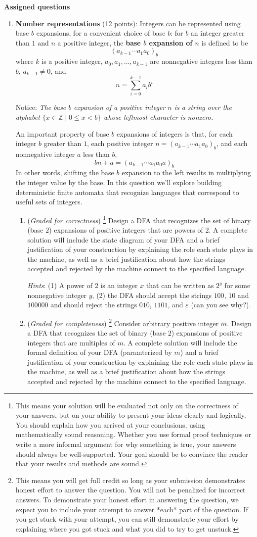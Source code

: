 \documentclass[12pt, oneside]{article}
\newcommand{\gradeCorrect}{({\it Graded for correctness}) }
\newcommand{\gradeCorrectFirst}{\gradeCorrect\footnote{This means your solution 
will be evaluated not only on the correctness of your answers, but on your ability
to present your ideas clearly and logically. You should explain how you 
arrived at your conclusions, using
mathematically sound reasoning. Whether you use formal proof techniques or 
write a more informal argument
for why something is true, your answers should always be well-supported. 
Your goal should be to convince the
reader that your results and methods are sound.} }
\newcommand{\gradeComplete}{({\it Graded for completeness}) }
\newcommand{\gradeCompleteFirst}{\gradeComplete\footnote{This means you will 
get full credit so long as your submission demonstrates honest effort to 
answer the question. You will not be penalized for incorrect answers. 
To demonstrate your honest effort in answering the question, we 
expect you to include your attempt to answer *each* part of the question. 
If you get stuck with your attempt, you can still demonstrate 
your effort by explaining where you got stuck and what 
you did to try to get unstuck.} }
\newcommand{\st}{\mid}
\begin{document}
{\bf Assigned questions}
\begin{enumerate}[wide, labelwidth=!, labelindent=0pt]
\item \textbf{Number representations} (12 points):
Integers can be represented using base $b$ expansions, for a convenient choice of base $b$: 
for $b$ an integer greater than $1$ and $n$ a positive integer, 
the {\bf base $b$ expansion of $n$}  is defined to be
\[
(a_{k-1} \cdots a_1 a_0)_b
\]
where $k$ is a positive integer, $a_0, a_1, \ldots, a_{k-1}$ 
are nonnegative integers less than $b$, $a_{k-1} \neq  0$, and
\[
n =  \sum_{i=0}^{k-1} a_{i} b^{i}
\]

Notice: {\it The base $b$ expansion of a positive integer $n$ is a string over the alphabet 
$\{x \in \mathbb{Z} \st 0 \leq x < b\}$
whose leftmost character is nonzero.}

An important property of base $b$ expansions of integers is that, for each integer $b$ greater than $1$,
each positive integer $n = (a_{k-1} \cdots a_1 a_0)_b$, and each nonnegative integer $a$ less than $b$, 
\[
    bn + a = (a_{k-1} \cdots a_1 a_0a)_b
\]
In other words, shifting the base $b$ expansion to the left results in multiplying the integer value by the base.
In this question we'll explore building deterministic finite automata that recognize 
languages that correspond to useful sets of integers.

    \begin{enumerate}
    \item\gradeCorrectFirst Design a DFA that recognizes the set of binary (base $2$) expansions of 
    positive integers that are powers of $2$. A complete solution will include the state diagram of your DFA and 
    a brief justification 
    of your construction by explaining the role each state plays in the machine, as well as a brief 
    justification about how the strings accepted and rejected by the machine connect to the specified language.

    {\it Hints}: (1) A power of $2$ is an integer $x$ that can be written as $2^y$ for some nonnegative integer $y$, 
    (2) the DFA should accept the strings $100$, $10$ and $100000$ and should reject the 
    strings $010$, $1101$, and $\varepsilon$ (can you see why?).

    \item\gradeCompleteFirst Consider arbitrary positive integer $m$. Design a DFA that recognizes the 
    set of binary (base $2$) expansions of positive integers that are multiples of $m$. A complete solution will
    include the formal definition of your DFA (paramterized by $m$) and a brief justification of your 
    construction by explaining the role each state plays in the machine, as well as a brief 
    justification about how the strings accepted and rejected by the machine connect to the specified language.


\end{enumerate}
\end{enumerate}
\end{document}

